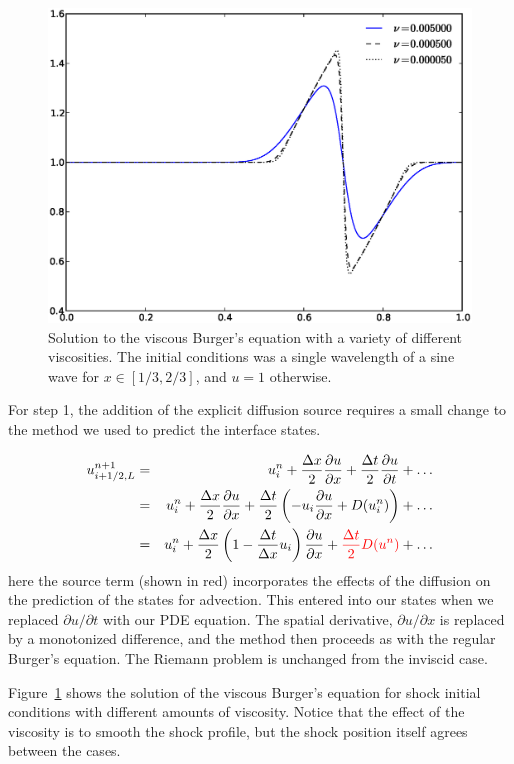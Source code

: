 \begin{figure}[t]
\centering
\includegraphics[width=5in]{burgervisc}
\caption[Viscous Burger's equation solution.]
  {\label{fig:viscburger} Solution to the viscous Burger's equation
  with a variety of different viscosities.  The initial conditions was
  a single wavelength of a sine wave for $x \in [1/3,2/3]$, and $u = 1$
  otherwise.
}
\end{figure}

For step 1, the addition of the explicit diffusion source requires
a small change to the method we used to predict the interface states.

\begin{eqnarray}
u^{n+1}_{i+1/2,L} &=& u^n_i + \frac{\Delta x}{2} \frac{\partial u}{\partial x}
                        + \frac{\Delta t}{2} \frac{\partial u}{\partial t} + \ldots \\
                &=& u^n_i + \frac{\Delta x}{2} \frac{\partial u}{\partial x}
                        + \frac{\Delta t}{2} \left (-u_i \frac{\partial u}{\partial x} + D(u^n_i) \right ) + \ldots \\
                &=& u^n_i + \frac{\Delta x}{2} \left ( 1 - \frac{\Delta t}{\Delta x}u_i \right ) \frac{\partial u}{\partial x} + {\color{red} \frac{\Delta t}{2} D(u^n) } + \ldots
\end{eqnarray}
here the source term (shown in red) incorporates the effects of the
diffusion on the prediction of the states for advection.  This entered
into our states when we replaced $\partial u/\partial t$ with our PDE
equation.  The spatial derivative, $\partial u/\partial x$ is replaced
by a monotonized difference, and the method then proceeds as with the
regular Burger's equation.  The Riemann problem is unchanged from the
inviscid case.

Figure~\ref{fig:viscburger} shows the solution of the viscous Burger's
equation for shock initial conditions with different amounts of
viscosity.  Notice that the effect of the viscosity is to smooth the
shock profile, but the shock position itself agrees between the cases.


